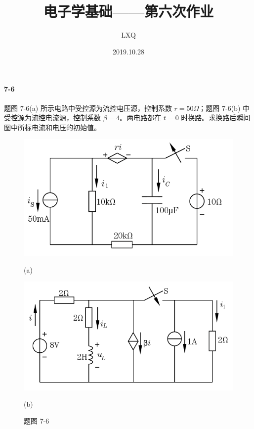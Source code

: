 \documentclass[hyperref, UTF8]{ctexart}
\title{电子学基础——第六次作业}
\author{LXQ}
\date{2019.10.28}
\newcommand{\ohm}{\Omega}
\begin{document}
\maketitle

\paragraph{7-6}\label{7-6}
题图 7-6(a) 所示电路中受控源为流控电压源，控制系数 $r=50\ohm$；题图 7-6(b) 中受控源为流控电流源，控制系数 $\beta = 4$。两电路都在 $t=0$ 时换路。求换路后瞬间图中所标电流和电压的初始值。

\begin{figure}[!htb]
\centering
\begin{minipage}[t]{0.397\textwidth}
\centering
\includegraphics[width=1\textwidth]{p7-6-a.png}
\caption*{(a)}
\end{minipage}
\begin{minipage}[t]{0.413\textwidth}
\centering
\includegraphics[width=1\textwidth]{p7-6-b.png}
\caption*{(b)}
\end{minipage}
\caption*{题图 7-6}
\end{figure}
\end{document}
